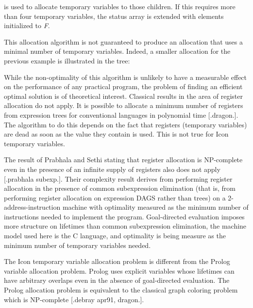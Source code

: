 \noindent is used to allocate temporary variables to those
children. If this requires more than four temporary variables, the
status array is extended with elements initialized to \textit{F}.

This allocation algorithm is not guaranteed to produce an allocation
that uses a minimal number of temporary variables.  Indeed, a smaller
allocation for the previous example is illustrated in the tree:

\begin{center}
\end{center}

While the non-optimality of this algorithm is unlikely to have a
measurable effect on the performance of any practical program, the
problem of finding an efficient optimal solution is of theoretical
interest. Classical results in the area of register allocation do not
apply. It is possible to allocate a minimum number of registers from
expression trees for conventional languages in polynomial time
[.dragon.]. The algorithm to do this depends on the fact that
registers (temporary variables) are dead as soon as the value they
contain is used. This is not true for Icon temporary variables.

The result of Prabhala and Sethi stating that register allocation is
NP-complete even in the presence of an infinite supply of registers
also does not apply [.prabhala subexp.]. Their complexity result
derives from performing register allocation in the presence of common
subexpression elimination (that is, from performing register
allocation on expression DAGS rather than trees) on a
2-address-instruction machine with optimality measured as the minimum
number of instructions needed to implement the program. Goal-directed
evaluation imposes more structure on lifetimes than common
subexpression elimination, the machine model used here is the C
language, and optimality is being measure as the minimum number of
temporary variables needed.

The Icon temporary variable allocation problem is different from the
Prolog variable allocation problem. Prolog uses explicit variables
whose lifetimes can have arbitrary overlaps even in the absence of
goal-directed evaluation. The Prolog allocation problem is equivalent
to the classical graph coloring problem which is NP-complete [.debray
apr91, dragon.].

